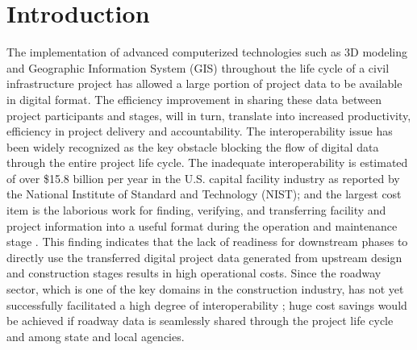 \documentclass[Journal,InsideFigs, DoubleSpace]{ascelike} %
\begin{document}
\section{Introduction}%
The implementation of advanced computerized technologies such as 3D modeling and Geographic Information System (GIS) throughout the life cycle of a civil infrastructure project has allowed a large portion of project data to be available in digital format. The efficiency improvement in sharing these data between project participants and stages, will in turn, translate into increased productivity, efficiency in project delivery and accountability. The interoperability issue has been widely recognized as the key obstacle blocking the flow of digital data through the entire project life cycle. The inadequate interoperability is estimated of over \$15.8 billion per year in the U.S. capital facility industry as reported by the National Institute of Standard and Technology (NIST); and the largest cost item is the laborious work for finding, verifying, and transferring facility and project information into a useful format during the operation and maintenance stage \cite{Gallaher04}. This finding indicates that the lack of readiness for downstream phases to directly use the transferred digital project data generated from upstream design and construction stages results in high operational costs. Since the roadway sector, which is one of the key domains in the construction industry, has not yet successfully facilitated a high degree of interoperability \cite{lefler14}; huge cost savings would be achieved if roadway data is seamlessly shared through the project life cycle and among state and local agencies.
\par
\end{document}
